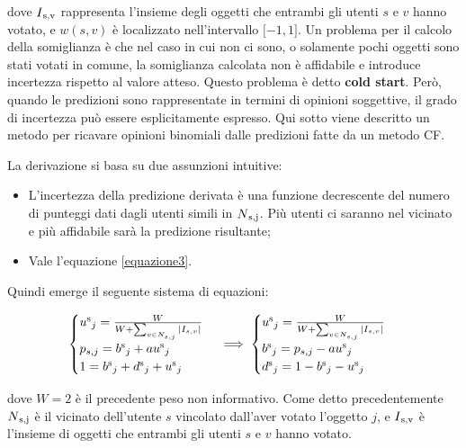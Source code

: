 \documentclass{report}
\begin{document}
	dove $I\textsubscript{s,v}$ rappresenta l'insieme degli oggetti che entrambi gli utenti $s$
	e $v$ hanno votato, e $w(s,v)$ è localizzato nell'intervallo ${[}-1,1{]}$. Un
	problema per il calcolo della somiglianza è che nel caso in cui non ci
	sono, o solamente pochi oggetti sono stati votati in comune, la
	somiglianza calcolata non è affidabile e introduce incertezza rispetto
	al valore atteso. Questo problema è detto \textbf{cold start}. Però, quando le
	predizioni sono rappresentate in termini di opinioni soggettive, il
	grado di incertezza può essere esplicitamente espresso. Qui sotto viene
	descritto un metodo per ricavare opinioni binomiali dalle predizioni
	fatte da un metodo CF.
	
	La derivazione si basa su due assunzioni intuitive:
	
	\begin{itemize}
		\item
		L'incertezza della predizione derivata è una funzione decrescente del
		numero di punteggi dati dagli utenti simili in $N\textsubscript{s,j}$. Più utenti ci
		saranno nel vicinato e più affidabile sarà la predizione risultante;
		\item
		Vale l'equazione \eqref{equazione3}.
	\end{itemize}
	
	Quindi emerge il seguente sistema di equazioni:
	
	\begin{center}
	\begin{equation}
	\begin{cases}
		u\textsuperscript{s}_j=\frac{W}{W+\sum_{v \in N_{s,j}}|I_{s,v}|}\\
		p_{s,j}=b\textsuperscript{s}_j+au\textsuperscript{s}_j\\
		1=b\textsuperscript{s}_j+d\textsuperscript{s}_j+u\textsuperscript{s}_j
	\end{cases} \implies 
	\begin{cases}
		u\textsuperscript{s}_j=\frac{W}{W+\sum_{v \in N_{s,j}}|I_{s,v}|}\\
		b\textsuperscript{s}_j=p_{s,j}-au\textsuperscript{s}_j\\
		d\textsuperscript{s}_j=1-b\textsuperscript{s}_j-u\textsuperscript{s}_j
	\end{cases} \label{equazione9}
	\end{equation}
	\end{center}
	
	dove $W = 2$ è il precedente peso non informativo. Come detto
	precedentemente $N\textsubscript{s,j}$ è il vicinato dell'utente $s$ vincolato dall'aver
	votato l'oggetto $j$, e $I\textsubscript{s,v}$ è l'insieme di oggetti che entrambi gli
	utenti $s$ e $v$ hanno votato.
	
\end{document}
